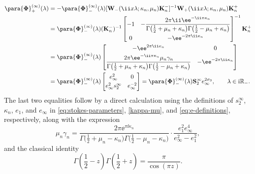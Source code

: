 \begin{align*}
 \para{\boldsymbol{\Phi}}_+^{(\infty)}(\lambda)&=-\para{\boldsymbol{\Phi}}_-^{(\infty)}(\lambda)[\mathbf{W}_{-}(\ii x\lambda;\kappa_n,\mu_n)\mathbf{K}_n^-]^{-1}\mathbf{W}_{+}(\ii x\lambda;\kappa_n,\mu_n)\mathbf{K}_n^+\\
 &=\para{\boldsymbol{\Phi}}_-^{(\infty)}(\lambda)(\mathbf{K}^-_n)^{-1}\begin{bmatrix}
 -1 & \displaystyle -\frac{2\pi \ii\ee^{-\ii\pi\kappa_n}}{\Gamma\big(\frac{1}{2}+\mu_n+\kappa_n\big)\Gamma\big(\frac{1}{2}-\mu_n+\kappa_n\big)}\vspace{1mm}\\
 0 & -\ee^{-2\pi \ii\kappa_n}
 \end{bmatrix}^{-1}\mathbf{K}_n^+\\
 &=\para{\boldsymbol{\Phi}}_-^{(\infty)}(\lambda)\begin{bmatrix}
 -\ee^{2\pi \ii\kappa_n} & 0\vspace{1mm}\\
 \displaystyle \frac{2\pi \ee^{-\ii\pi\kappa_n}\mu_n\gamma_n }{\Gamma\big(\frac{1}{2}+\mu_n+\kappa_n\big)\Gamma\big(\frac{1}{2}-\mu_n+\kappa_n\big)} &-\ee^{-2\pi \ii\kappa_n}
 \end{bmatrix} \\
 &= \para{\boldsymbol{\Phi}}_-^{(\infty)}(\lambda) \begin{bmatrix}e_{\infty}^{2}&0 \vspace{1mm}\\ e_\infty^2s_2^\infty&e_{\infty}^{-2}\end{bmatrix} = \para{\boldsymbol{\Phi}}_-^{(\infty)}(\lambda) \mathbf{S}_2^\infty e_\infty^{2\sigma_3}, \qquad \lambda\in\mathrm{i}\mathbb{R}_-.
\end{align*}
The last two equalities follow by a direct calculation using the definitions of $s_2^\infty$, $\kappa_n$, $e_1$, and $e_\infty$ in \eqref{eq:stokes-parameters}, \eqref{kappa-mu}, and \eqref{eq:e-definitions}, respectively, along with the expression
\begin{equation} \label{Qinfty-gammainfty}
 \mu_n \gamma_n = \dfrac{2\pi \ee^{\pi \ii \kappa_n}}{\Gamma\big( \frac{1}{2} + \mu_n - \kappa_n\big)\Gamma\big( \frac{1}{2} - \mu_n - \kappa_n\big)} \cdot \frac{e_1^2 e_\infty^4}{e_\infty^2 - e_1^2},
\end{equation}
and the classical identity
\begin{equation}
\label{eq:Gamma-reflection}
\Gamma \left(\frac{1}{2} - z \right) \Gamma \left(\frac{1}{2} + z \right) = \dfrac{\pi }{\cos(\pi z)}.
\end{equation}

